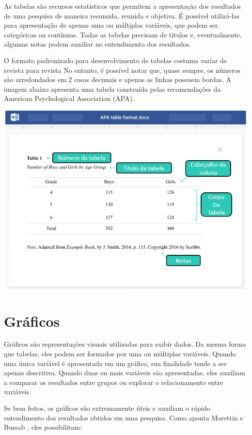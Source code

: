 \documentclass[
]{book}
\begin{document}
As tabelas são recursos estatísticos que permitem a apresentação dos resultados de uma pesquisa de maneira resumida, reunida e objetiva. É possível utilizá-las para apresentação de apenas uma ou múltiplas variáveis, que podem ser categóricas ou contínuas. Todas as tabelas precisam de títulos e, eventualmente, algumas notas podem auxiliar no entendimento dos resultados.

O formato padronizado para desenvolvimento de tabelas costuma variar de revista para revista No entanto, é possível notar que, quase sempre, os números são arredondados em 2 casas decimais e apenas as linhas possuem bordas. A imagem abaixo apresenta uma tabela construída pelas recomendações da American Psychological Association (APA).

\includegraphics{./img/cap_desc_tabela.png}

\hypertarget{gruxe1ficos}{%
\section{Gráficos}\label{gruxe1ficos}}

Gráficos são representações visuais utilizadas para exibir dados. Da mesma forma que tabelas, eles podem ser formados por uma ou múltiplas variáveis. Quando uma única variável é apresentada em um gráfico, sua finalidade tende a ser apenas descritiva. Quando duas ou mais variáveis são apresentadas, eles auxiliam a comparar os resultados entre grupos ou explorar o relacionamento entre variáveis.

Se bem feitos, os gráficos são extremamente úteis e auxiliam o rápido entendimento dos resultados obtidos em uma pesquisa. Como aponta Morettin e Bussab \citeyearpar{morettin_bussab_2010}, eles possibilitam:
\end{document}
